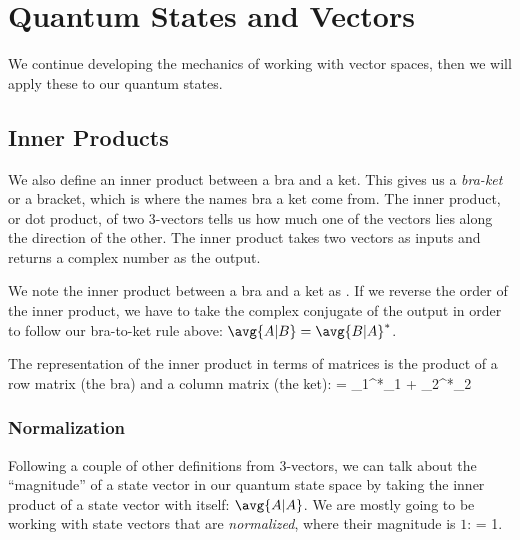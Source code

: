 \chapter{Quantum States and Vectors}

We continue developing the mechanics of working with vector spaces, then we will apply these to our quantum states.

\section{Inner Products}

We also define an inner product between a bra and a ket. This gives us a {\em bra-ket} or a bracket, which is where the names bra a ket come from. The inner product, or dot product, of two 3-vectors tells us how much one of the vectors lies along the direction of the other. The inner product takes two vectors as inputs and returns a complex number as the output.
\begin{marginfigure}\centering
{}
\end{marginfigure}
We note the inner product between a bra and a ket as
\bas
{}\equiv {}.
\eas
If we reverse the order of the inner product, we have to take the complex conjugate of the output in order to follow our bra-to-ket rule above: $\avg{A|B} = \avg{B|A}^*$.

The representation of the inner product in terms of matrices is the product of a row matrix (the bra) and a column matrix (the ket):
\beq
{}\Meq{} = \alpha_1^*\beta_1 + \alpha_2^*\beta_2
\eeq{}

\subsection{Normalization}
Following a couple of other definitions from 3-vectors, we can talk about the ``magnitude'' of a state vector in our quantum state space by taking the inner product of a state vector with itself: $\avg{A|A}$. We are mostly going to be working with state vectors that are {\em normalized}, where their magnitude is $1$:
\beq
{} = 1.
\eeq

